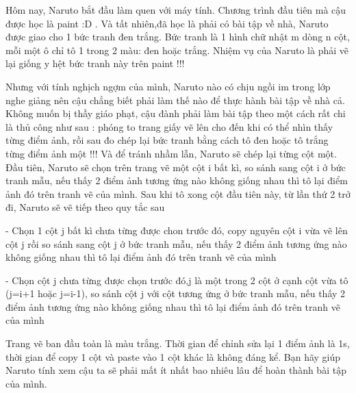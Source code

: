 Hôm nay, Naruto bắt đầu làm quen với máy tính. Chương trình đầu tiên mà cậu được học là paint :D . Và tất nhiên,đã học là phải có bài tập về nhà, Naruto được giao cho 1 bức tranh đen trắng. Bức tranh là 1 hình chữ nhật m dòng n cột, mỗi một ô chỉ tô 1 trong 2 màu: đen hoặc trắng. Nhiệm vụ của Naruto là phải vẽ lại giống y hệt bức tranh này trên paint !!!  

   Nhưng với tính nghịch ngợm của mình, Naruto nào có chịu ngồi im trong lớp nghe giảng nên cậu chẳng biết phải làm thế nào để thực hành bài tập về nhà cả. Không muốn bị thầy giáo phạt, cậu đành phải làm bài tập theo một cách rất chi là thủ công như sau : phóng to trang giấy vẽ lên cho đến khi có thể nhìn thấy từng điểm ảnh, rồi sau đo chép lại bức tranh bằng cách tô đen hoặc tô trắng từng điểm ảnh một !!! Và để tránh nhầm lẫn, Naruto sẽ chép lại từng cột một. Đầu tiên, Naruto sẽ chọn trên trang vẽ một cột i bất kì, so sánh sang cột i ở bức tranh mẫu, nếu thấy 2 điểm ảnh tương ứng nào không giống nhau thì tô lại điểm ảnh đó trên tranh vẽ của mình. Sau khi tô xong cột đầu tiên này, từ lần thứ 2 trở đi, Naruto sẽ vẽ tiếp theo quy tắc sau  

   - Chọn 1 cột j bất kì chưa từng được chon trước đó, copy nguyên cột i vừa vẽ lên cột j rồi so sánh sang cột j ở bức tranh mẫu, nếu thấy 2 điểm ảnh tương ứng nào không giống nhau thì tô lại điểm ảnh đó trên tranh vẽ của mình  

   - Chọn cột j chưa từng được chọn trước đó,j là một trong 2 cột ở cạnh cột vừa tô (j=i+1 hoặc j=i-1), so sánh cột j với cột tương ứng ở bức tranh mẫu, nếu thấy 2 điểm ảnh tương ứng nào không giống nhau thì tô lại điểm ảnh đó trên tranh vẽ của mình  

   Trang vẽ ban đầu toàn là màu trắng. Thời gian để chỉnh sửa lại 1 điểm ảnh là 1s, thời gian để copy 1 cột và paste vào 1 cột khác là không đáng kể. Bạn hãy giúp Naruto tính xem cậu ta sẽ phải mất ít nhất bao nhiêu lâu để hoàn thành bài tập của mình.  

\